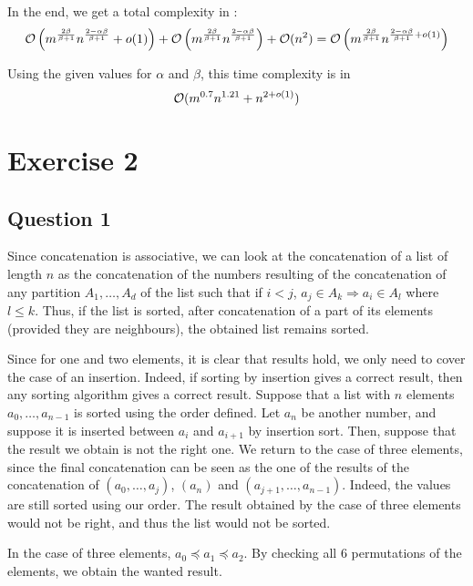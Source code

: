 \documentclass{cours}
\begin{document}
        In the end, we get a total complexity in :
        \[
            \mathcal{O}\left(m^{\frac{2\beta}{\beta + 1}}n^{\frac{2 - \alpha \beta}{\beta + 1}} + o(1)\right) + \mathcal{O}\left(m^{\frac{2\beta}{\beta + 1}}n^{\frac{2 - \alpha \beta}{\beta + 1}}\right) + \mathcal{O}(n^{2}) = \mathcal{O}\left(m^{\frac{2\beta}{\beta + 1}}n^{\frac{2 - \alpha \beta}{\beta + 1} + o(1)}\right)
        \]

        Using the given values for $\alpha$ and $\beta$, this time complexity is in \[\mathcal{O}(m^{0.7}n^{1.21} + n^{2 + o(1)})\]

    \newpage
    \section{Exercise 2}
        \subsection{Question 1}
            Since concatenation is associative, we can look at the concatenation of a list of length $n$ as the concatenation of the numbers resulting of the concatenation of any partition $A_{1}, \ldots, A_{d}$ of the list such that if $i < j$, $a_{j} \in A_{k} \Rightarrow a_{i} \in A_{l}$ where $l \leq k$. Thus, if the list is sorted, after concatenation of a part of its elements (provided they are neighbours), the obtained list remains sorted.

            Since for one and two elements, it is clear that results hold, we only need to cover the case of an insertion. Indeed, if sorting by insertion gives a correct result, then any sorting algorithm gives a correct result. Suppose that a list with $n$ elements $a_{0}, \ldots, a_{n- 1}$ is sorted using the order defined. Let $a_{n}$ be another number, and suppose it is inserted between $a_{i}$ and $a_{i + 1}$ by insertion sort.
            Then, suppose that the result we obtain is not the right one. We return to the case of three elements, since the final concatenation can be seen as the one of the results of the concatenation of $(a_{0}, \ldots, a_{j})$, $(a_{n})$ and $(a_{j + 1}, \ldots, a_{n - 1})$. Indeed, the values are still sorted using our order. The result obtained by the case of three elements would not be right, and thus the list would not be sorted.

            In the case of three elements, $a_{0} \preceq a_{1} \preceq a_{2}$. By checking all $6$ permutations of the elements, we obtain the wanted result.
\end{document}
